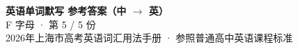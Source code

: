 \documentclass[10pt,a4paper]{article}
\begin{document}
\pagestyle{plain}

\begin{center}
{\LARGE\bfseries 英语单词默写 \quad 参考答案（中 $\to$ 英）}\\[0.22em]
{\large F 字母 · 第 5 / 5 份}\\[0.18em]
{\small 2026年上海市高考英语词汇用法手册 · 参照普通高中英语课程标准}
\end{center}

\vspace{0.2em}
\noindent{\color{rulegray}\rule{\textwidth}{0.8pt}}

\vspace{0.35em}

\vspace{0.25em}
\renewcommand{\arraystretch}{1.32}
\end{document}
